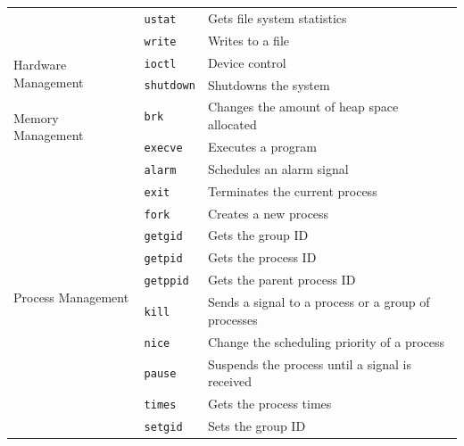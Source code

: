 \documentclass[10pt,a4paper]{article}
\begin{document}
\begin{table}[b]
\begin{tabular}{l l l}
	                                     & \texttt{ustat}    & Gets file system statistics                         \\
	                                     & \texttt{write}    & Writes to a file                                    \\
	\midrule
	\multirow{2}{*}{Hardware Management} & \texttt{ioctl}    & Device control                                      \\
	                                     & \texttt{shutdown} & Shutdowns the system                                \\
	\midrule
	\multirow{2}{*}{Memory Management}   & \texttt{brk}      & Changes the amount of heap space allocated          \\
	                                     & \texttt{execve}   & Executes a program                                  \\
	\midrule
	\multirow{13}{*}{Process Management} & \texttt{alarm}    & Schedules an alarm signal                           \\
	                                     & \texttt{exit}     & Terminates the current process                      \\
	                                     & \texttt{fork}     & Creates a new process                               \\
	                                     & \texttt{getgid}   & Gets the group ID                                   \\
	                                     & \texttt{getpid}   & Gets the process ID                                 \\
	                                     & \texttt{getppid}  & Gets the parent process ID                          \\
	                                     & \texttt{kill}     & Sends a signal to a process or a group of processes \\
	                                     & \texttt{nice}     & Change the scheduling priority of a process         \\
	                                     & \texttt{pause}    & Suspends the process until a signal is received     \\
	                                     & \texttt{times}    & Gets the process times                              \\
	                                     & \texttt{setgid}   & Sets the group ID                                   \\

\end{tabular}
\end{table}
\end{document}
